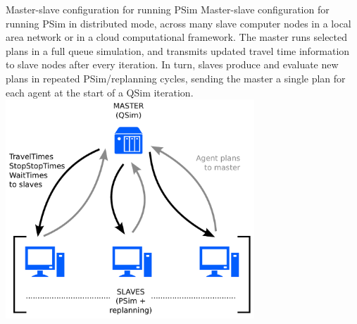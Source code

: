 \createfigure%
{Master-slave configuration for running PSim}%
{Master-slave configuration for running PSim in distributed mode, across many slave computer nodes in a local area network or in a cloud computational framework. The master runs selected plans in a full queue simulation, and transmits updated travel time information to slave nodes after every iteration. In turn, slaves produce and evaluate new plans in repeated PSim/replanning cycles, sending the master a single plan for each agent at the start of a QSim iteration.}%
{\label{fig:distributedPSim}}%
{\includegraphics[width=0.7\textwidth, angle=0]{extending/figures/PSim/distributed}}%
{}

